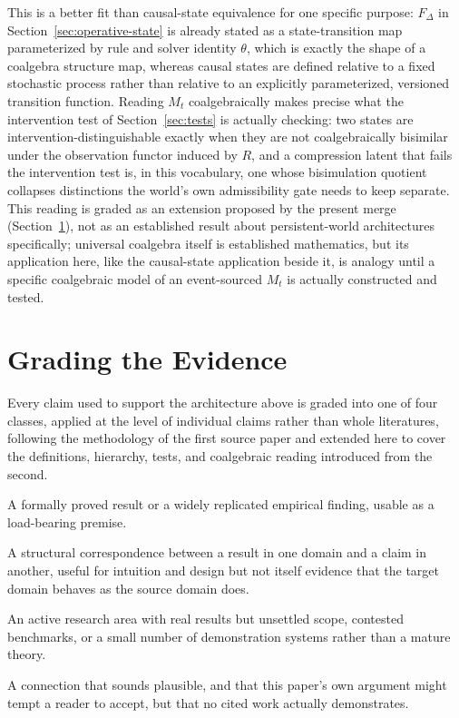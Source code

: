 \documentclass[11pt]{article}
\begin{document}
This is a better fit than causal-state equivalence for one specific purpose: $F_\Delta$ in Section~\ref{sec:operative-state} is already stated as a state-transition map parameterized by rule and solver identity $\theta$, which is exactly the shape of a coalgebra structure map, whereas causal states are defined relative to a fixed stochastic process rather than relative to an explicitly parameterized, versioned transition function. Reading $M_t$ coalgebraically makes precise what the intervention test of Section~\ref{sec:tests} is actually checking: two states are intervention-distinguishable exactly when they are not coalgebraically bisimilar under the observation functor induced by $R$, and a compression latent that fails the intervention test is, in this vocabulary, one whose bisimulation quotient collapses distinctions the world's own admissibility gate needs to keep separate. This reading is graded as an extension proposed by the present merge (Section~\ref{sec:grading}), not as an established result about persistent-world architectures specifically; universal coalgebra itself is established mathematics, but its application here, like the causal-state application beside it, is analogy until a specific coalgebraic model of an event-sourced $M_t$ is actually constructed and tested.

\section{Grading the Evidence}
\label{sec:grading}

Every claim used to support the architecture above is graded into one of four classes, applied at the level of individual claims rather than whole literatures, following the methodology of the first source paper and extended here to cover the definitions, hierarchy, tests, and coalgebraic reading introduced from the second.

\begin{description}[leftmargin=1.8cm, style=nextline]
\item[\textbf{Established (E).}] A formally proved result or a widely replicated empirical finding, usable as a load-bearing premise.
\item[\textbf{Analogy (A).}] A structural correspondence between a result in one domain and a claim in another, useful for intuition and design but not itself evidence that the target domain behaves as the source domain does.
\item[\textbf{Emerging (M).}] An active research area with real results but unsettled scope, contested benchmarks, or a small number of demonstration systems rather than a mature theory.
\item[\textbf{Unsupported (U).}] A connection that sounds plausible, and that this paper's own argument might tempt a reader to accept, but that no cited work actually demonstrates.
\end{description}
\end{document}
